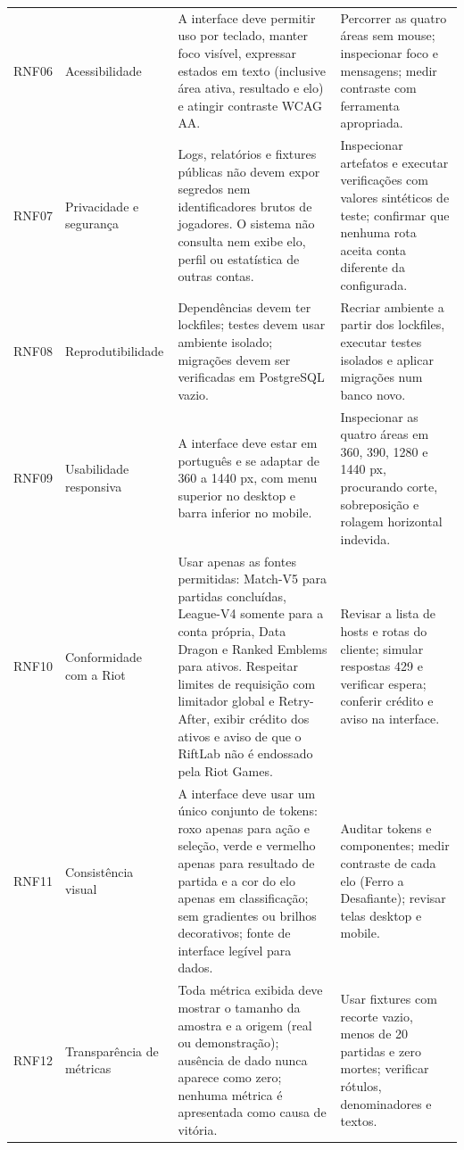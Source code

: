 \documentclass[12pt,a4paper]{article}
\begin{document}
\begin{longtable}{@{}p{1.25cm}p{3.6cm}p{5.6cm}p{4.3cm}@{}}
RNF06 & Acessibilidade & A interface deve permitir uso por teclado, manter foco visível, expressar estados em texto (inclusive área ativa, resultado e elo) e atingir contraste WCAG AA. & Percorrer as quatro áreas sem mouse; inspecionar foco e mensagens; medir contraste com ferramenta apropriada. \\
RNF07 & Privacidade e segurança & Logs, relatórios e fixtures públicas não devem expor segredos nem identificadores brutos de jogadores. O sistema não consulta nem exibe elo, perfil ou estatística de outras contas. & Inspecionar artefatos e executar verificações com valores sintéticos de teste; confirmar que nenhuma rota aceita conta diferente da configurada. \\
RNF08 & Reprodutibilidade & Dependências devem ter lockfiles; testes devem usar ambiente isolado; migrações devem ser verificadas em PostgreSQL vazio. & Recriar ambiente a partir dos lockfiles, executar testes isolados e aplicar migrações num banco novo. \\
RNF09 & Usabilidade responsiva & A interface deve estar em português e se adaptar de 360 a 1440 px, com menu superior no desktop e barra inferior no mobile. & Inspecionar as quatro áreas em 360, 390, 1280 e 1440 px, procurando corte, sobreposição e rolagem horizontal indevida. \\
RNF10 & Conformidade com a Riot & Usar apenas as fontes permitidas: Match-V5 para partidas concluídas, League-V4 somente para a conta própria, Data Dragon e Ranked Emblems para ativos. Respeitar limites de requisição com limitador global e Retry-After, exibir crédito dos ativos e aviso de que o RiftLab não é endossado pela Riot Games. & Revisar a lista de hosts e rotas do cliente; simular respostas 429 e verificar espera; conferir crédito e aviso na interface. \\
RNF11 & Consistência visual & A interface deve usar um único conjunto de tokens: roxo apenas para ação e seleção, verde e vermelho apenas para resultado de partida e a cor do elo apenas em classificação; sem gradientes ou brilhos decorativos; fonte de interface legível para dados. & Auditar tokens e componentes; medir contraste de cada elo (Ferro a Desafiante); revisar telas desktop e mobile. \\
RNF12 & Transparência de métricas & Toda métrica exibida deve mostrar o tamanho da amostra e a origem (real ou demonstração); ausência de dado nunca aparece como zero; nenhuma métrica é apresentada como causa de vitória. & Usar fixtures com recorte vazio, menos de 20 partidas e zero mortes; verificar rótulos, denominadores e textos. \\
\end{longtable}
\normalsize
\end{document}
